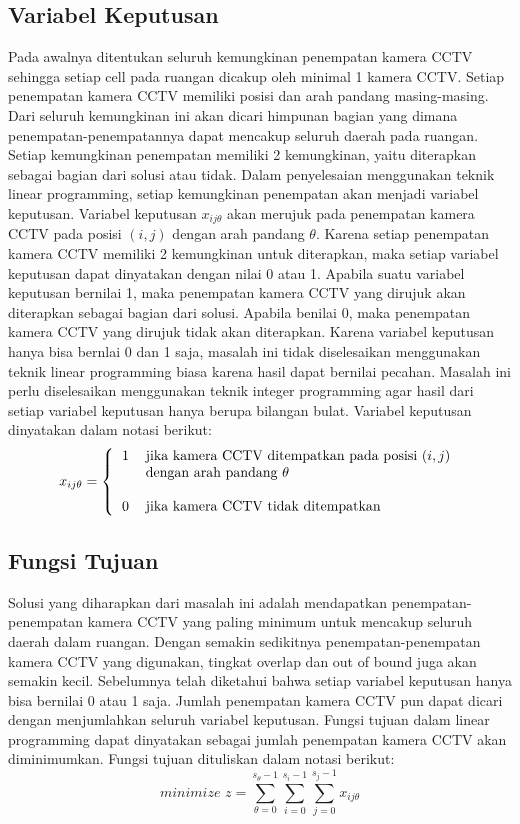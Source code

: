 \subsection{Variabel Keputusan}
Pada awalnya ditentukan seluruh kemungkinan penempatan kamera CCTV sehingga setiap cell pada ruangan dicakup oleh minimal 1 kamera CCTV. Setiap penempatan kamera CCTV memiliki posisi dan arah pandang masing-masing. Dari seluruh kemungkinan ini akan dicari himpunan bagian yang dimana penempatan-penempatannya dapat mencakup seluruh daerah pada ruangan. Setiap kemungkinan penempatan memiliki 2 kemungkinan, yaitu diterapkan sebagai bagian dari solusi atau tidak. Dalam penyelesaian menggunakan teknik linear programming, setiap kemungkinan penempatan akan menjadi variabel keputusan. Variabel keputusan \(x_{ij\theta}\) akan merujuk pada penempatan kamera CCTV pada posisi \((i,j)\) dengan arah pandang \(\theta\). Karena setiap penempatan kamera CCTV memiliki 2 kemungkinan untuk diterapkan, maka setiap variabel keputusan dapat dinyatakan dengan nilai 0 atau 1. Apabila suatu variabel keputusan bernilai 1, maka penempatan kamera CCTV yang dirujuk akan diterapkan sebagai bagian dari solusi. Apabila benilai 0, maka penempatan kamera CCTV yang dirujuk tidak akan diterapkan. Karena variabel keputusan hanya bisa bernlai 0 dan 1 saja, masalah ini tidak diselesaikan menggunakan teknik linear programming biasa karena hasil dapat bernilai pecahan. Masalah ini perlu diselesaikan menggunakan teknik integer programming agar hasil dari setiap variabel keputusan hanya berupa bilangan bulat. Variabel keputusan dinyatakan dalam notasi berikut:
\begin{equation*}
	x_{ij\theta} =
	\left \{
  		\begin{tabular}{cl}
  			1 & jika kamera CCTV ditempatkan pada posisi $(i,j)$\\
  			  & dengan arah pandang $\theta$\\
  			  &  \\
  			0 & jika kamera CCTV tidak ditempatkan
  		\end{tabular}
  	\right.
\end{equation*}

\subsection{Fungsi Tujuan}
Solusi yang diharapkan dari masalah ini adalah mendapatkan penempatan-penempatan kamera CCTV yang paling minimum untuk mencakup seluruh daerah dalam ruangan. Dengan semakin sedikitnya penempatan-penempatan kamera CCTV yang digunakan, tingkat overlap dan out of bound juga akan semakin kecil. Sebelumnya telah diketahui bahwa setiap variabel keputusan hanya bisa bernilai 0 atau 1 saja. Jumlah penempatan kamera CCTV pun dapat dicari dengan menjumlahkan seluruh variabel keputusan. Fungsi tujuan dalam linear programming dapat dinyatakan sebagai jumlah penempatan kamera CCTV akan diminimumkan. Fungsi tujuan dituliskan dalam notasi berikut:
\begin{equation*}
	\textit{minimize }z = \sum_{\theta=0}^{s_{\theta}-1} \sum_{i=0}^{s_i-1} \sum_{j=0}^{s_j-1} x_{ij\theta}
\end{equation*}

